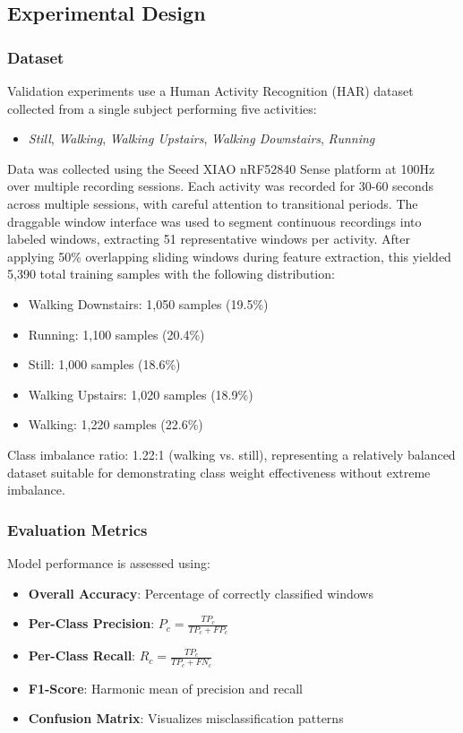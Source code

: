 \subsection{Experimental Design}

\subsubsection{Dataset}
Validation experiments use a Human Activity Recognition (HAR) dataset collected from a single subject performing five activities:
\begin{itemize}
    \item \textit{Still}, \textit{Walking}, \textit{Walking Upstairs}, \textit{Walking Downstairs}, \textit{Running}
\end{itemize}
Data was collected using the Seeed XIAO nRF52840 Sense platform at 100Hz over multiple recording sessions. Each activity was recorded for 30-60 seconds across multiple sessions, with careful attention to transitional periods. The draggable window interface was used to segment continuous recordings into labeled windows, extracting 51 representative windows per activity. After applying 50\% overlapping sliding windows during feature extraction, this yielded 5,390 total training samples with the following distribution:
\begin{itemize}
    \item Walking Downstairs: 1,050 samples (19.5\%)
    \item Running: 1,100 samples (20.4\%)
    \item Still: 1,000 samples (18.6\%)
    \item Walking Upstairs: 1,020 samples (18.9\%)
    \item Walking: 1,220 samples (22.6\%)
\end{itemize}
Class imbalance ratio: 1.22:1 (walking vs. still), representing a relatively balanced dataset suitable for demonstrating class weight effectiveness without extreme imbalance.

\subsubsection{Evaluation Metrics}
Model performance is assessed using:
\begin{itemize}
    \item \textbf{Overall Accuracy}: Percentage of correctly classified windows
    \item \textbf{Per-Class Precision}: $P_c = \frac{TP_c}{TP_c + FP_c}$
    \item \textbf{Per-Class Recall}: $R_c = \frac{TP_c}{TP_c + FN_c}$
    \item \textbf{F1-Score}: Harmonic mean of precision and recall
    \item \textbf{Confusion Matrix}: Visualizes misclassification patterns
\end{itemize}

